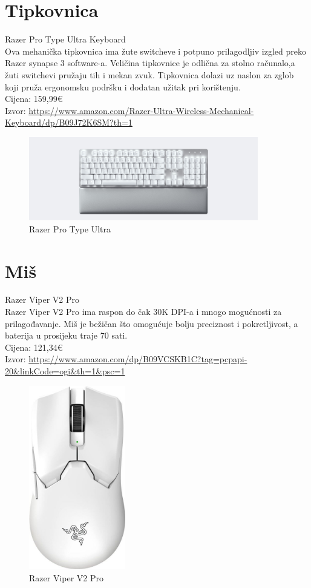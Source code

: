 \documentclass{report}
\begin{document}
\chapter{Tipkovnica}
Razer Pro Type Ultra Keyboard
\\Ova mehanička tipkovnica ima žute switcheve i potpuno prilagodljiv izgled preko Razer synapse 3 software-a. Veličina tipkovnice je odlična za stolno računalo,a žuti switchevi pružaju tih i mekan zvuk. Tipkovnica dolazi uz naslon za zglob koji pruža ergonomsku podršku i dodatan užitak pri korištenju.
\\Cijena: 159,99€
\\Izvor:  \url{https://www.amazon.com/Razer-Ultra-Wireless-Mechanical-Keyboard/dp/B09J72K6SM?th=1}
\begin{figure}[h]
\includegraphics[width=10cm]{tipkovnica.jpg}
\caption{Razer Pro Type Ultra}
\end{figure}

\chapter{Miš}
Razer Viper V2 Pro
\\Razer Viper V2 Pro ima raspon do čak 30K DPI-a i mnogo mogućnosti za prilagođavanje. Miš je bežičan što omogućuje bolju preciznost i pokretljivost, a baterija u prosijeku traje 70 sati.
\\Cijena: 121,34€
\\Izvor:  \url{https://www.amazon.com/dp/B09VCSKB1C?tag=pcpapi-20&linkCode=ogi&th=1&psc=1}
\begin{figure}[h]
\includegraphics[height=8cm]{mis.jpg}
\caption{Razer Viper V2 Pro}
\end{figure}
\end{document}
